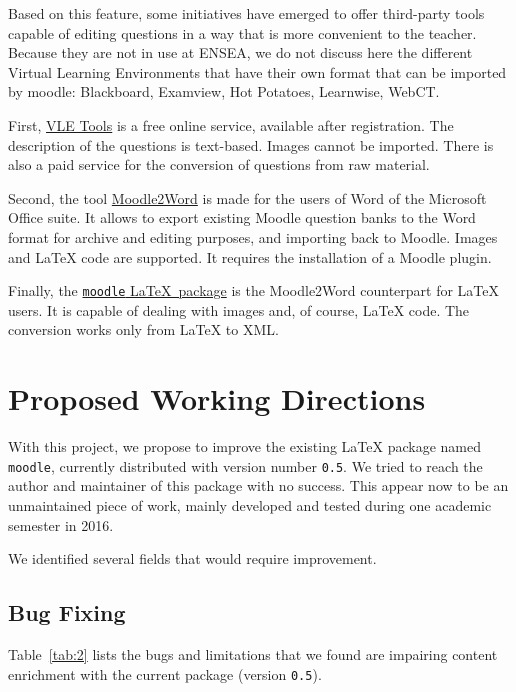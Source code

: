 \documentclass[twocolumn,a4paper,9pt]{article}
\begin{document}
Based on this feature, some initiatives have emerged to offer third-party tools 
capable of editing questions in a way that is more convenient to the teacher. 
Because they are not in use at ENSEA, we do not discuss here the different 
Virtual Learning Environments that have their own format that can be imported 
by moodle: Blackboard, Examview, Hot Potatoes, Learnwise, WebCT.

First, \href{http://www.vletools.com}{VLE Tools} is a free online service, 
available after registration. The description of the questions is text-based. 
Images cannot be imported. There is also a paid service for the conversion of 
questions from raw material.%

Second, the tool 
\href{https://docs.moodle.org/34/en/Word_table_format}{Moodle2Word} is made for 
the users of Word of the Microsoft Office suite. It allows to export existing 
Moodle question banks to the Word format for archive and editing purposes, and 
importing back to Moodle. Images and \LaTeX{} code are supported. It requires 
the installation of a Moodle plugin.

Finally, the \href{https://www.ctan.org/pkg/moodle}{\texttt{moodle} \LaTeX\ 
package} is the Moodle2Word counterpart for \LaTeX{} users. It is capable of 
dealing with images and, of course, \LaTeX{} code. The conversion works only 
from \LaTeX{} to XML.

\section{Proposed Working Directions}

With this project, we propose to improve the existing \LaTeX{} package named 
\texttt{moodle}, currently distributed with version number \texttt{0.5}.
We tried to reach the author and maintainer of this package with no success. 
This appear now to be an unmaintained piece of work, mainly developed and 
tested during one academic semester in 2016.

We identified several fields that would require improvement.

\subsection{Bug Fixing}

Table~\ref{tab:2} lists the bugs and limitations that we found are impairing 
content enrichment with the current package (version \texttt{0.5}).
\end{document}
